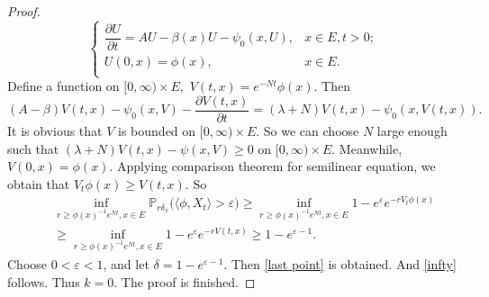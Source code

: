 \documentclass[12pt,a4paper]{amsart}
\numberwithin{equation}{section}
\theoremstyle{plain}
\theoremstyle{definition}
\theoremstyle{remark}
\begin{document}
\begin{proof}
\begin{equation}\label{eq diff}
\begin{cases}
	\dfrac{\partial U}{\partial t}=AU-\beta(x)U-\psi_0(x, U),& x\in E, t>0;\\
	U(0,x)=\phi(x),& x\in E.\\
\end{cases}
\end{equation}
	Define a function on $[0,\infty)\times E,$ $V(t,x)=e^{-Nt}\phi(x).$  Then
\[
	(A-\beta)V(t,x)-\psi_0(x, V)-\frac{\partial V(t,x)}{\partial t}=(\lambda +N)V(t,x)-\psi_0(x,V(t,x)).
\]
	It is obvious that $V$ is bounded on $[0,\infty)\times E$.  So we can choose $N$ large enough such that $(\lambda+N)V(t,x)-\psi(x,V)\geq 0$ on $[0,\infty)\times E.$
	Meanwhile, $V(0,x)=\phi(x)$.  Applying comparison theorem for semilinear equation, we obtain that $V_t\phi(x)\geq V(t,x)$.  So
\begin{eqnarray*}
	&&\inf_{r\geq \phi(x)^{-1}e^{Nt}, x\in E}\mathbb P_{r\delta_x}\big(\langle\phi, X_t \rangle >\varepsilon\big)\geq \inf_{r\geq \phi(x)^{-1}e^{Nt}, x\in E} 1-e^{\varepsilon}e^{-rV_t\phi(x)}\\
    &&\geq \inf_{r\geq \phi(x)^{-1}e^{Nt}, x\in E} 1-e^{\varepsilon}e^{-rV(t,x)}
     \geq 1-e^{\varepsilon-1}.
\end{eqnarray*}
	Choose $0<\varepsilon<1$, and let $\delta=1-e^{\varepsilon-1}$.  Then \eqref{last point} is obtained. And
\eqref{infty} follows. Thus $k=0$. The proof is finished.
\end{proof}
\end{document}
